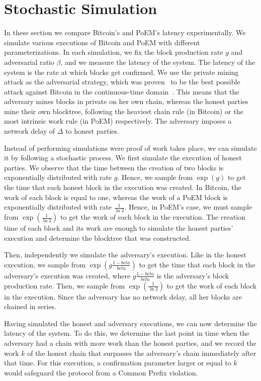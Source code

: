 \section{Stochastic Simulation}
In these section we compare Bitcoin's and PoEM's latency experimentally.
We simulate various executions of Bitcoin and PoEM with different parameterizations.
In each simulation, we fix the block production rate $g$ and adversarial ratio $\beta$, and we
measure the latency of the system.
The latency of the system is the rate at which blocks get confirmed.
We use the private mining attack as the adversarial strategy, which was
proven~\cite{eiar} to be the best possible attack against Bitcoin in the continuous-time domain~\cite{bitcoin-made-simple}.
This means that the adversary mines blocks in private on her own chain, whereas the honest parties mine
their own blocktree, following the heaviest chain rule (in Bitcoin) or the most intrinsic work rule (in PoEM) respectively.
The adversary imposes a network delay of $\Delta$ to honest parties.

Instead of performing simulations were proof of work takes place, we can simulate it by following a stochastic process.
We first simulate the execution of honest parties. We observe that the time between the creation of two blocks is
exponentially distributed with rate $g$. Hence, we sample from $\exp(g)$ to get the time that each honest block in the
execution was created. In Bitcoin, the work of each block is equal to one, whereas the work of a PoEM block is exponentially
distributed with rate $\frac{1}{\ln2}$. Hence, in PoEM's case, we must sample from $\exp(\frac{1}{\ln2})$ to get the work
of each block in the execution. The creation time of each block and its work are enough to simulate the honest parties' execution
and determine the blocktree that was constructed.

Then, independently we simulate the adversary's execution. Like in the honest execution, we sample from $\exp(g\frac{1 - beta}{beta})$
to get the time that each block in the adversary's execution was created, where $g\frac{1 - beta}{beta}$ is the adversary's block production rate.
Then, we sample from $\exp(\frac{1}{\ln2})$ to get the work of each block in the execution.
Since the adversary has no network delay, all her blocks are chained in series.

Having simulated the honest and adversary executions, we can now determine the latency of the system.
To do this, we determine the last point in time when the adversary had a chain with more work than the honest parties,
and we record the work $k$ of the honest chain that surpasses the adversary's chain immediately after that time.
For this execution, a confirmation parameter larger or equal to $k$ would safeguard the protocol from a Common Prefix violation.

